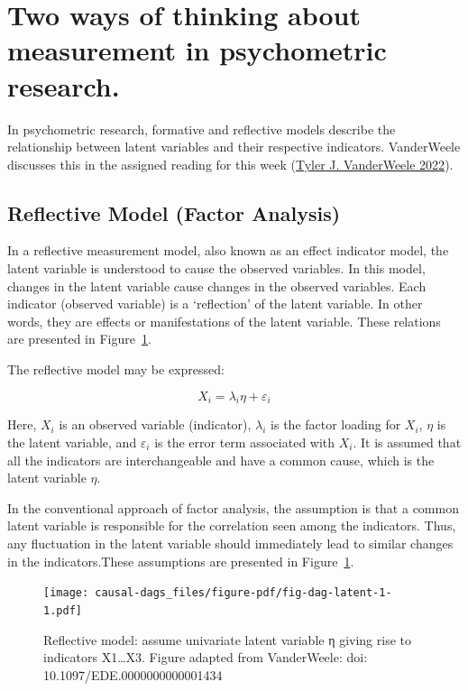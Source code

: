 \documentclass[
  singlecolumn]{report}
\begin{document}
\hypertarget{two-ways-of-thinking-about-measurement-in-psychometric-research.}{%
\section{Two ways of thinking about measurement in psychometric
research.}\label{two-ways-of-thinking-about-measurement-in-psychometric-research.}}

In psychometric research, formative and reflective models describe the
relationship between latent variables and their respective indicators.
VanderWeele discusses this in the assigned reading for this week
(\protect\hyperlink{ref-vanderweele2022}{Tyler J. VanderWeele 2022}).

\hypertarget{reflective-model-factor-analysis}{%
\subsection{Reflective Model (Factor
Analysis)}\label{reflective-model-factor-analysis}}

In a reflective measurement model, also known as an effect indicator
model, the latent variable is understood to cause the observed
variables. In this model, changes in the latent variable cause changes
in the observed variables. Each indicator (observed variable) is a
`reflection' of the latent variable. In other words, they are effects or
manifestations of the latent variable. These relations are presented in
Figure~\ref{fig-dag-latent-1}.

The reflective model may be expressed:

\[X_i = \lambda_i \eta + \varepsilon_i\]

Here, \(X_i\) is an observed variable (indicator), \(\lambda_i\) is the
factor loading for \(X_i\), \(\eta\) is the latent variable, and
\(\varepsilon_i\) is the error term associated with \(X_i\). It is
assumed that all the indicators are interchangeable and have a common
cause, which is the latent variable \(\eta\).

In the conventional approach of factor analysis, the assumption is that
a common latent variable is responsible for the correlation seen among
the indicators. Thus, any fluctuation in the latent variable should
immediately lead to similar changes in the indicators.These assumptions
are presented in Figure~\ref{fig-dag-latent-1}.

\begin{figure}

{\centering \texttt{[image: causal-dags\_files/figure-pdf/fig-dag-latent-1-1.pdf]}

}

\caption{\label{fig-dag-latent-1}Reflective model: assume univariate
latent variable η giving rise to indicators X1\ldots X3. Figure adapted
from VanderWeele: doi: 10.1097/EDE.0000000000001434}

\end{figure}
\end{document}
